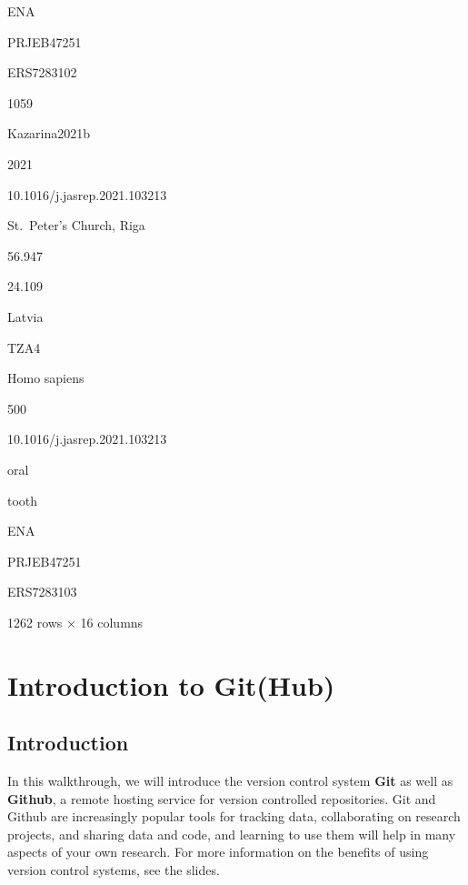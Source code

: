 \documentclass[
  letterpaper,
]{book}
\begin{document}
ENA

PRJEB47251

ERS7283102

1059

Kazarina2021b

2021

10.1016/j.jasrep.2021.103213

St.~Peter's Church, Riga

56.947

24.109

Latvia

TZA4

Homo sapiens

500

10.1016/j.jasrep.2021.103213

oral

tooth

ENA

PRJEB47251

ERS7283103

1262 rows × 16 columns

\hypertarget{introduction-to-github}{%
\chapter{Introduction to Git(Hub)}\label{introduction-to-github}}

\hypertarget{introduction-2}{%
\section{Introduction}\label{introduction-2}}

In this walkthrough, we will introduce the version control system
\textbf{Git} as well as \textbf{Github}, a remote hosting service for
version controlled repositories. Git and Github are increasingly popular
tools for tracking data, collaborating on research projects, and sharing
data and code, and learning to use them will help in many aspects of
your own research. For more information on the benefits of using version
control systems, see the slides.
\end{document}
